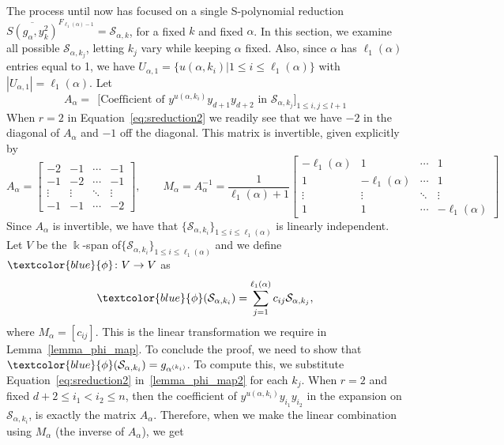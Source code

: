 \documentclass[10pt,a4paper]{article}
\def\field{\Bbbk}
\newcommand{\blue}[1]{\textcolor{blue}{#1}}
\begin{document}
The process until now has focused on a single S-polynomial reduction $\overline{S(g_\alpha, y_k^2)}^{F_{\ell_1(\alpha)-1}} =\mathcal{S}_{\alpha, k} $, for a fixed $k$ and fixed $\alpha$. In this section, we examine all possible $\mathcal{S}_{\alpha, k_{j}}$, letting $k_j$ vary while keeping $\alpha$ fixed. Also, since $\alpha$ has $\ell_1(\alpha)$ entries equal to 1, we have $U_{\alpha, 1}=\big\{u(\alpha,k_i)\big| 1\le i\le \ell_1(\alpha)\big\}$ with  $|U_{\alpha,1}| = \ell_1(\alpha)$. Let
   $$A_\alpha = \ \  \Big[ \text{Coefficient of } y^{u(\alpha, k_i)}y_{d+1}y_{d+2} \text{ in } \mathcal{S}_{\alpha,k_j} \Big]_{1 \leq i,j \leq l+1}$$
When $r=2$ in Equation~\eqref{eq:sreduction2} we readily see that we have $-2$ in the diagonal of $A_\alpha$ and $-1$ off the  diagonal. 
This matrix is invertible, given explicitly by
$$
    A_\alpha  =  
    \begin{bmatrix} -2 & -1 & \cdots  & -1 \\-1 & -2 &  \cdots & -1 \\  \vdots & \vdots & \ddots  & \vdots \\ -1 & -1 & \cdots & -2 \end{bmatrix},
    \qquad
    M_\alpha =A_\alpha^{-1}  = \frac{1}{\ell_1(\alpha)+1} 
    \begin{bmatrix} -\ell_1(\alpha) & 1 & \cdots  & 1 \\1 & -\ell_1(\alpha)& \cdots & 1 \\ \vdots & \vdots  & \ddots & \vdots \\ 1 & 1 & \cdots  & -\ell_1(\alpha)  \end{bmatrix}
$$
Since $A_\alpha$ is invertible, we have that $\{\mathcal{S}_{\alpha, k_i}\}_{1 \leq i \leq \ell_1(\alpha)}$ is linearly independent. Let $V$ be the $\field$-span of\break $\{\mathcal{S}_{\alpha, k_i}\}_{1 \leq i \leq \ell_1(\alpha)}$ and we define $\blue{\phi}\colon V \to  V$ as 
\begin{equation} \label{lemma_phi_map2}
    \blue{\phi} (\mathcal{S}_{\alpha, k_i}) = \sum_{j=1}^{\ell_1(\alpha)} c_{ij} \mathcal{S}_{\alpha, {k_{j}}},
\end{equation}
where $M_\alpha=[c_{ij}]$. This is the linear transformation we require in  Lemma~\ref{lemma_phi_map}. To conclude the proof, we need to show that  $\blue{\phi}(\mathcal{S}_{\alpha, k_i})  = g_{\alpha^{(k_i)}}$. To compute this, we substitute Equation~\eqref{eq:sreduction2} in~\eqref{lemma_phi_map2} for each $k_j$. When $r=2$ and fixed $d+2 \leq i_1 < i_2 \leq n$, then the coefficient of 
$y^{u(\alpha, k_i)} y_{i_1} y_{i_2}$ in the expansion on $\mathcal{S}_{\alpha, k_i}$, is exactly the matrix $A_\alpha$. Therefore, when we make the linear combination using $M_\alpha$ (the  inverse of $A_\alpha$), we get
\end{document}

